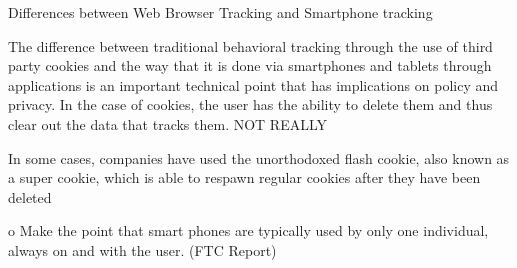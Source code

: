 Differences between Web Browser Tracking and Smartphone tracking

The difference between traditional behavioral tracking through the use of third party cookies and the way that it is done via smartphones and tablets through applications is an important technical point that has implications on policy and privacy. In the case of cookies, the user has the ability to delete them and thus clear out the data that tracks them. NOT REALLY

In some cases, companies have used the unorthodoxed flash cookie, also known as a super cookie, which is able to respawn regular cookies after they have been deleted

o Make the point that smart phones are typically used by only one individual, always on and with the user. (FTC Report)








